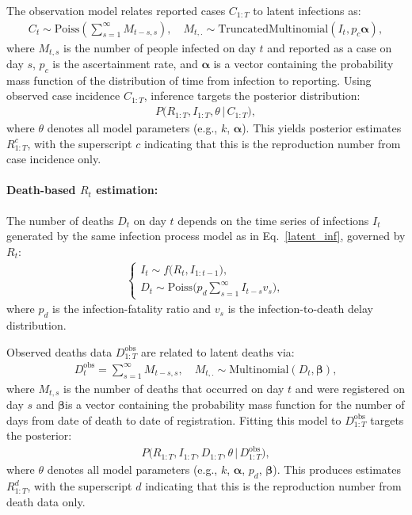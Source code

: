 \documentclass{article}
\begin{document}
The observation model relates reported cases $C_{1:T}$ to latent infections as:
\begin{align}\label{obs_inf}
C_t \sim \mathrm{Poiss}\left( \sum_{s=1}^\infty M_{t-s,s} \right), \quad M_{t,.} \sim \mathrm{TruncatedMultinomial}(I_t, p_c\boldsymbol{\alpha}),
\end{align}
where $M_{t,s}$ is the number of people infected on day $t$ and reported as a case on day $s$, $p_c$ is the ascertainment rate, and $\boldsymbol{\alpha}$  is a vector containing the probability mass function of the distribution of time from infection to reporting. Using observed case incidence $C_{1:T}$, inference targets the posterior distribution:
\begin{align}
P\big(R_{1:T}, I_{1:T}, \theta \,\big|\, C_{1:T}\big),
\end{align}
where $\theta$ denotes all model parameters (e.g., $k$, $\boldsymbol{\alpha}$). This yields posterior estimates $R_{1:T}^{c}$, with the superscript $c$ indicating that this is the reproduction number from case incidence only.

\paragraph{Death-based $R_{t}$ estimation:}
The number of deaths $D_t$ on day $t$ depends on the time series of infections $I_{t}$ generated by the same infection process model as in Eq.~\eqref{latent_inf}, governed by $R_{t}$:
\begin{align}\label{latent_death}
\begin{cases}
I_t \sim f\big(R_t, I_{1:t-1}\big),\\[4pt]
D_t \sim \mathrm{Poiss}\!\Big( p_d \sum_{s=1}^\infty I_{t-s} v_s \Big),
\end{cases}
\end{align}
where $p_d$ is the infection-fatality ratio and $v_s$ is the infection-to-death delay distribution.

Observed deaths data $D^{\text{obs}}_{1:T}$ are related to latent deaths via:
\begin{align}\label{obs_death}
D^{\text{obs}}_t = \sum_{s=1}^\infty M_{t-s,s}, \quad M_{t,.} \sim \mathrm{Multinomial}(D_t, \boldsymbol{\beta}),
\end{align}
where $M_{t,s}$ is the number of deaths that occurred on day $t$ and were registered on day $s$ and $\boldsymbol{\beta}$is a vector containing the probability mass function for the number of days from date of death
to date of registration.  Fitting this model to $D^{\text{obs}}_{1:T}$ targets the posterior:
\begin{align}
P\big(R_{1:T}, I_{1:T}, D_{1:T}, \theta \,\big|\, D^{\text{obs}}_{1:T}\big),
\end{align}
where $\theta$ denotes all model parameters (e.g., $k$, $\boldsymbol{\alpha}$, $p_d$, $\boldsymbol{\beta}$).  
This produces estimates $R_{1:T}^d$, with the superscript $d$ indicating that this is the reproduction number from death data only.
\end{document}
